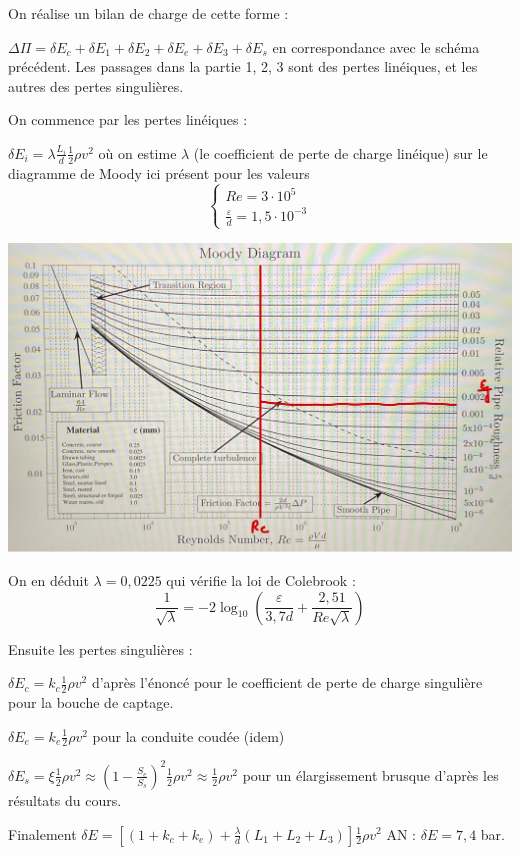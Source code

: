 \documentclass[12pt]{article}
\begin{document}
On réalise un bilan de charge de cette forme :

$\Delta \Pi = \delta E_c + \delta E_1 + \delta E_2 + \delta E_e + \delta E_3 +\delta E_s$ en correspondance avec le schéma précédent. Les passages dans la partie 1, 2, 3 sont des pertes linéiques, et les autres des pertes singulières. 

On commence par les pertes linéiques :

$\delta E_i = \lambda \frac{L_i}{d} \frac{1}{2} \rho v^2$ où on estime $\lambda$ (le coefficient de perte de charge linéique) sur le diagramme de Moody ici présent pour les valeurs 
$$
\begin{cases}
Re = 3 \cdot 10^5 \\
\frac{\varepsilon}{d} = 1{,}5 \cdot 10^{-3}
\end{cases}
$$

\includegraphics[scale=0.3]{4 image.jpg}

On en déduit $\lambda=0,0225$ qui vérifie la loi de Colebrook :
$$
\frac{1}{\sqrt{\lambda}} = -2 \log_{10} \left( \frac{\varepsilon}{3{,}7d} + \frac{2{,}51}{Re \sqrt{\lambda}} \right)
$$

Ensuite les pertes singulières :

$\delta E_c = k_c \frac{1}{2} \rho v^2$ d'après l'énoncé pour le coefficient de perte de charge singulière pour la bouche de captage.

$\delta E_e = k_e \frac{1}{2} \rho v^2$ pour la conduite coudée (idem)

$\delta E_s = \xi \frac{1}{2} \rho v^2 \approx (1-\frac{S_e}{S_s})^2 \frac{1}{2} \rho v^2 \approx \frac{1}{2} \rho v^2$ pour un élargissement brusque d'après les résultats du cours.

Finalement $\boxed{\delta E = [(1+k_c+k_e) + \frac{\lambda}{d}(L_1+L_2+L_3)] \frac{1}{2} \rho v^2}$ AN : $\delta E = 7,4$ bar.
\end{document}
